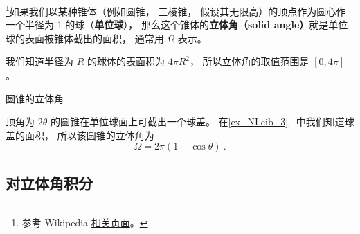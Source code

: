 
\begin{issues}
\issueTODO
\end{issues}


\footnote{参考 Wikipedia \href{https://en.wikipedia.org/wiki/Solid_angle}{相关页面}。}如果我们以某种锥体（例如圆锥， 三棱锥， 假设其无限高）的顶点作为圆心作一个半径为 1 的球（\textbf{单位球}）， 那么这个锥体的\textbf{立体角（solid angle）}就是单位球的表面被锥体截出的面积， 通常用 $\Omega$ 表示。

我们知道半径为 $R$ 的球体的表面积为 $4\pi R^2$， 所以立体角的取值范围是 $[0, 4\pi]$。

\begin{example}{圆锥的立体角}

顶角为 $2\theta$ 的圆锥在单位球面上可截出一个球盖。 在\autoref{ex_NLeib_3}~ 中我们知道球盖的面积， 所以该圆锥的立体角为
\begin{equation}
\Omega = 2\pi (1 - \cos\theta)~.
\end{equation}
\end{example}

\subsection{对立体角积分}
